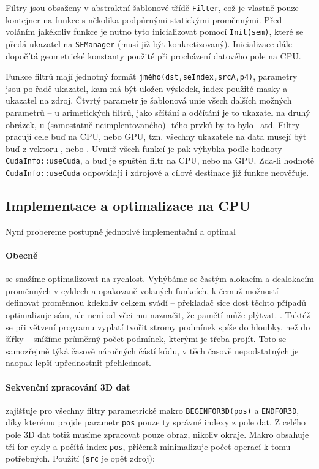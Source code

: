     Filtry jsou obsaženy v abstraktní šablonové třídě {\tt Filter}, což je vlastně pouze kontejner na funkce s několika podpůrnými statickými proměnnými. Před voláním jakékoliv funkce je nutno tyto inicializovat pomocí {\tt Init(sem)}, které se předá ukazatel na {\tt SEManager} (musí již být konkretizovaný). Inicializace dále dopočítá geometrické konstanty použité při procházení datového pole na CPU.

    Funkce filtrů mají jednotný formát {\tt jmého(dst,seIndex,srcA,p4)}, parametry jsou po řadě ukazatel, kam má být uložen výsledek, index použité masky a ukazatel na zdroj. Čtvrtý parametr je šablonová unie všech dalších možných parametrů -- u arimetických \bq filtrů\eq, jako sčítání a odčítání je to ukazatel na druhý obrázek, u (samostatně neimplentovaného) \kk-tého prvků by to bylo \kk ~atd. Filtry pracují cele buď na CPU, nebo GPU, tzn. všechny ukazatele na data musejí být buď z vektoru \image, nebo \imageGpu. Uvnitř všech funkcí je pak výhybka podle hodnoty {\tt CudaInfo::useCuda}, a buď je spuštěn filtr na CPU, nebo na GPU. Zda-li hodnotě {\tt CudaInfo::useCuda} odpovídají i zdrojové a cílové destinace již funkce neověřuje.

    \subsection{Implementace a optimalizace na CPU}

        Nyní probereme postupně jednotlvé implementační a optimal

        \paragraph{Obecně} se snažíme optimalizovat na rychlost. Vyhýbáme se častým alokacím a dealokacím proměnných v cyklech a opakovaně volaných funkcích, k čemuž \Cpp možností definovat proměnnou kdekoliv celkem svádí -- překladač sice dost těchto případů optimalizuje sám, ale není od věci mu naznačit, že pamětí může plýtvat. . Taktéž se při větvení programu vyplatí tvořit stromy podmínek spíše do hloubky, než do šířky -- snížíme průměrný počet podmínek, kterými je třeba projít. Toto se samozřejmě týká časově náročných částí kódu, v těch časově nepodstatných je naopak lepší upřednostnit přehlednost. 

        \paragraph{Sekvenční zpracování 3D dat} zajišťuje pro všechny filtry parametrické makro {\tt BEGINFOR3D(pos)} a {\tt ENDFOR3D}, díky kterému projde parametr {\tt pos} pouze ty správné indexy z pole dat. Z celého pole 3D dat totiž musíme zpracovat pouze obraz, nikoliv okraje. Makro obsahuje tři for-cykly a počítá index {\tt pos}, přičemž minimalizuje počet operací k tomu potřebných. Použití ({\tt src} je opět zdroj):

